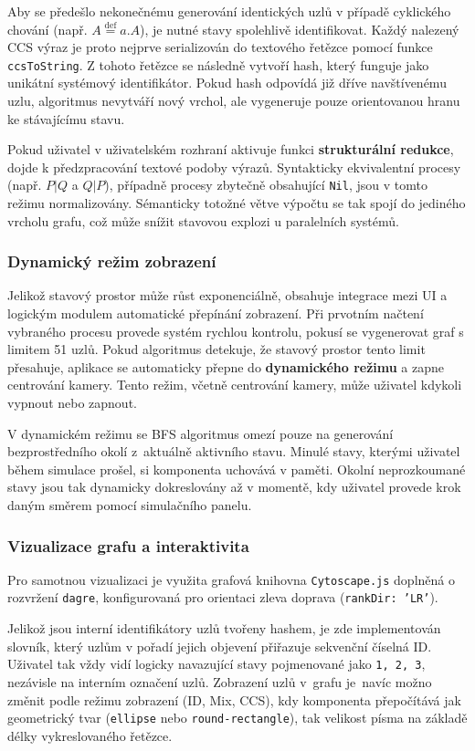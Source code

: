 Aby se předešlo nekonečnému generování identických uzlů v případě cyklického chování (např. $A \stackrel{\text{def}}{=} a.A$), je nutné stavy spolehlivě identifikovat. 
Každý nalezený CCS výraz je proto nejprve serializován do textového řetězce pomocí funkce \texttt{ccsToString}. 
Z tohoto řetězce se následně vytvoří hash, který funguje jako unikátní systémový identifikátor. 
Pokud hash odpovídá již dříve navštívenému uzlu, algoritmus nevytváří nový vrchol, ale vygeneruje pouze orientovanou hranu ke stávajícímu stavu.

Pokud uživatel v uživatelském rozhraní aktivuje funkci \textbf{strukturální redukce}, dojde k předzpracování textové podoby výrazů. 
Syntakticky ekvivalentní procesy (např. $P|Q$ a $Q|P$), případně procesy zbytečně obsahující \texttt{Nil}, jsou v tomto režimu normalizovány. 
Sémanticky totožné větve výpočtu se tak spojí do jediného vrcholu grafu, což může snížit stavovou explozi u paralelních systémů.

\subsubsection*{Dynamický režim zobrazení}
Jelikož stavový prostor může růst exponenciálně, obsahuje integrace mezi UI a logickým modulem automatické přepínání zobrazení. 
Při prvotním načtení vybraného procesu provede systém rychlou kontrolu, pokusí se vygenerovat graf s limitem 51 uzlů. 
Pokud algoritmus detekuje, že stavový prostor tento limit přesahuje, aplikace se automaticky přepne do \textbf{dynamického režimu} a zapne centrování kamery. 
Tento režim, včetně centrování kamery, může uživatel kdykoli vypnout nebo zapnout.

V dynamickém režimu se BFS algoritmus omezí pouze na generování bezprostředního okolí z~aktuálně aktivního stavu. 
Minulé stavy, kterými uživatel během simulace prošel, si komponenta uchovává v paměti. 
Okolní neprozkoumané stavy jsou tak dynamicky dokreslovány až v momentě, kdy uživatel provede krok daným směrem pomocí simulačního panelu.

\subsubsection*{Vizualizace grafu a interaktivita}
Pro samotnou vizualizaci je využita grafová knihovna \texttt{Cytoscape.js} doplněná o rozvržení \texttt{dagre}, konfigurovaná pro orientaci zleva doprava (\texttt{rankDir: 'LR'}). 

Jelikož jsou interní identifikátory uzlů tvořeny hashem, je zde implementován slovník, který uzlům v pořadí jejich objevení přiřazuje sekvenční číselná ID. 
Uživatel tak vždy vidí logicky navazující stavy pojmenované jako \texttt{1, 2, 3}, nezávisle na interním označení uzlů. 
Zobrazení uzlů v~grafu je~navíc možno změnit podle režimu zobrazení (ID, Mix, CCS), kdy komponenta přepočítává jak geometrický tvar (\texttt{ellipse} nebo \texttt{round-rectangle}), tak velikost písma na základě délky vykreslovaného řetězce.


